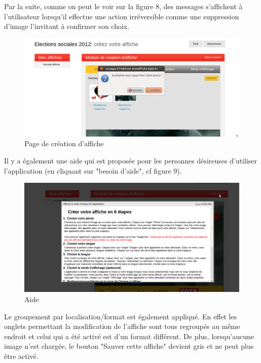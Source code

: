 \documentclass{article}
\begin{document}
\begin{sffamily}
Par la suite, comme on peut le voir sur la figure 8, des messages s'affichent à l'utilisateur 
lorsqu'il effectue une action irréversible comme une suppression d'image l'invitant à confirmer son choix.

\begin{figure}[h!]
	\begin{center}
		\includegraphics[scale=0.28]{ergo_003.png}
		\caption{Page de création d'affiche}
	\end{center}
\end{figure}

Il y a également une aide qui est proposée pour les personnes 
désireuses d'utiliser l'application (en cliquant sur "besoin d'aide", cf figure 9).

\begin{figure}[h!]
	\begin{center}
		\includegraphics[scale=0.3]{ergo_004.png} 
		\caption{Aide}
	\end{center}
\end{figure}

Le groupement par localisation/format est également appliqué. En effet les onglets permettant la modification de l'affiche sont tous regroupés au même endroit et celui qui a 
été activé est d'un format différent. De plus, lorsqu'aucune image n'est chargée, le bouton "Sauver cette affiche" devient gris et ne peut plus être activé.


\end{sffamily}
\end{document}
